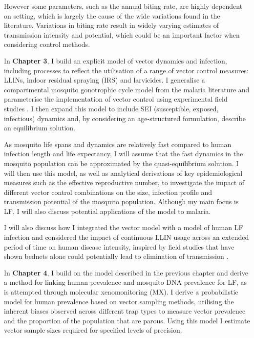 However some parameters, such as the annual biting rate, are highly dependent on setting, which is largely the cause of the wide variations found in the literature. Variations in biting rate result in widely varying estimates of transmission intensity and potential, which could be an important factor when considering control methods.

In \textbf{Chapter 3}, I build an explicit model of vector dynamics and infection, including processes to reflect the utilisation of a range of vector control measures: LLINs, indoor residual spraying (IRS) and larvicides. I generalise a compartmental mosquito gonotrophic cycle model from the malaria literature \cite{Killeen2000} and parameterise the implementation of vector control using experimental field studies \cite{Ngufor2011,Kroeger1995}. I then expand this model to include SEI (susceptible, exposed, infectious) dynamics and, by considering an age-structured formulation, describe an equilibrium solution.

As mosquito life spans and dynamics are relatively fast compared to human infection length and life expectancy, I will assume that the fast dynamics in the mosquito population can be approximated by the quasi-equilibrium solution. I will then use this model, as well as analytical derivations of key epidemiological measures such as the effective reproductive number, to investigate the impact of different vector control combinations on the size, infection profile and transmission potential of the mosquito population. Although my main focus is LF, I will also discuss potential applications of the model to malaria.

I will also discuss how I integrated the vector model with a model of human LF infection and considered the impact of continuous LLIN usage across an extended period of time on human disease intensity, inspired by field studies that have shown bednets alone could potentially lead to elimination of transmission \cite{rebollo2015}.

In \textbf{Chapter 4}, I build on the model described in the previous chapter and derive a method for linking human prevalence and mosquito DNA prevalence for LF, as is attempted through molecular xenomonitoring (MX). I derive a probabilistic model for human prevalence based on vector sampling methods, utilising the inherent biases observed across different trap types to measure vector prevalence and the proportion of the population that are parous. Using this model I estimate vector sample sizes required for specified levels of precision.

